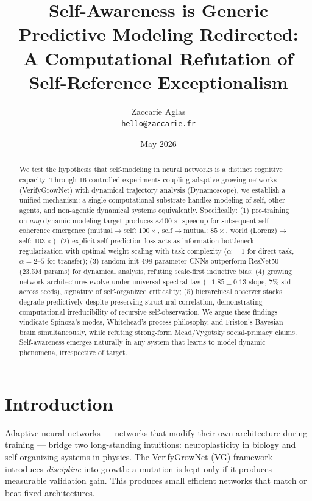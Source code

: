 \documentclass[11pt]{article}
\title{Self-Awareness is Generic Predictive Modeling Redirected:\\
A Computational Refutation of Self-Reference Exceptionalism}
\author{Zaccarie Aglas\\\texttt{hello@zaccarie.fr}}
\date{May 2026}
\begin{document}
\maketitle

\begin{abstract}
We test the hypothesis that self-modeling in neural networks is a distinct cognitive capacity. Through 16 controlled experiments coupling adaptive growing networks (VerifyGrowNet) with dynamical trajectory analysis (Dynamoscope), we establish a unified mechanism: a single computational substrate handles modeling of self, other agents, and non-agentic dynamical systems equivalently. Specifically: (1) pre-training on \emph{any} dynamic modeling target produces $\sim 100\times$ speedup for subsequent self-coherence emergence (mutual$\to$self: $100\times$, self$\to$mutual: $85\times$, world (Lorenz)$\to$self: $103\times$); (2) explicit self-prediction loss acts as information-bottleneck regularization with optimal weight scaling with task complexity ($\alpha{=}1$ for direct task, $\alpha{=}2$--$5$ for transfer); (3) random-init 498-parameter CNNs outperform ResNet50 (23.5M params) for dynamical analysis, refuting scale-first inductive bias; (4) growing network architectures evolve under universal spectral law ($-1.85 \pm 0.13$ slope, 7\% std across seeds), signature of self-organized criticality; (5) hierarchical observer stacks degrade predictively despite preserving structural correlation, demonstrating computational irreducibility of recursive self-observation. We argue these findings vindicate Spinoza's modes, Whitehead's process philosophy, and Friston's Bayesian brain simultaneously, while refuting strong-form Mead/Vygotsky social-primacy claims. Self-awareness emerges naturally in any system that learns to model dynamic phenomena, irrespective of target.
\end{abstract}

\section{Introduction}

Adaptive neural networks --- networks that modify their own architecture during training --- bridge two long-standing intuitions: neuroplasticity in biology and self-organizing systems in physics. The VerifyGrowNet (VG) framework~\cite{aglas2026verifygrow} introduces \emph{discipline} into growth: a mutation is kept only if it produces measurable validation gain. This produces small efficient networks that match or beat fixed architectures.
\end{document}
